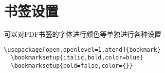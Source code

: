﻿\section{书签设置}

可以对PDF书签的字体进行颜色等单独进行各种设置

\begin{lstlisting}[language={[LaTeX]TeX}]
  \usepackage[open,openlevel=1,atend]{bookmark}
  \bookmarksetup{italic,bold,color=blue}
  \bookmarksetup{bold=false,color={}}
\end{lstlisting}
